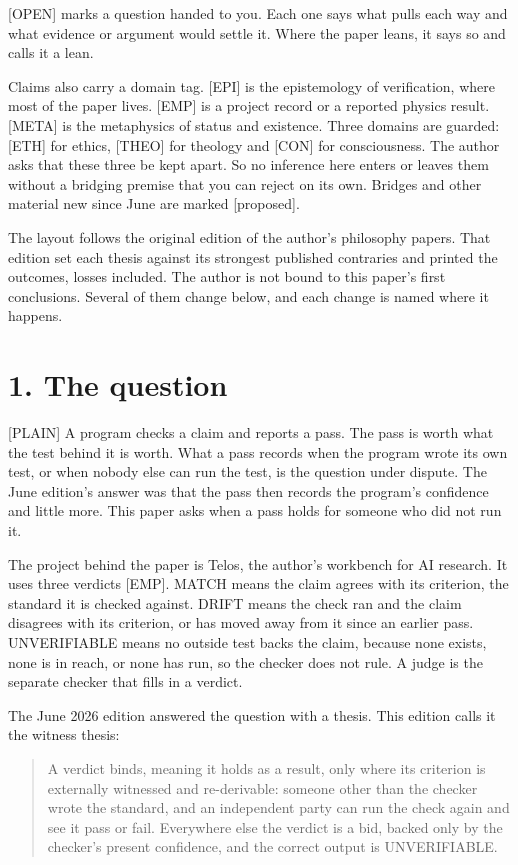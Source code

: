 \documentclass[11pt]{article}
\newcommand{\register}[1]{{\ttfamily\small #1}}
\begin{document}
\register{[OPEN]} marks a question handed to you. Each one says what pulls each way and what evidence or argument would settle it. Where the paper leans, it says so and calls it a lean.

Claims also carry a domain tag. [EPI] is the epistemology of verification, where most of the paper lives. [EMP] is a project record or a reported physics result. [META] is the metaphysics of status and existence. Three domains are guarded: [ETH] for ethics, [THEO] for theology and [CON] for consciousness. The author asks that these three be kept apart. So no inference here enters or leaves them without a bridging premise that you can reject on its own. Bridges and other material new since June are marked [proposed].

The layout follows the original edition of the author's philosophy papers. That edition set each thesis against its strongest published contraries and printed the outcomes, losses included. The author is not bound to this paper's first conclusions. Several of them change below, and each change is named where it happens.

\section*{1. The question}

\register{[PLAIN]} A program checks a claim and reports a pass. The pass is worth what the test behind it is worth. What a pass records when the program wrote its own test, or when nobody else can run the test, is the question under dispute. The June edition's answer was that the pass then records the program's confidence and little more. This paper asks when a pass holds for someone who did not run it.

The project behind the paper is Telos, the author's workbench for AI research. It uses three verdicts [EMP]. MATCH means the claim agrees with its criterion, the standard it is checked against. DRIFT means the check ran and the claim disagrees with its criterion, or has moved away from it since an earlier pass. UNVERIFIABLE means no outside test backs the claim, because none exists, none is in reach, or none has run, so the checker does not rule. A judge is the separate checker that fills in a verdict.

The June 2026 edition answered the question with a thesis. This edition calls it the witness thesis:

\begin{quote}
A verdict binds, meaning it holds as a result, only where its criterion is externally witnessed and re-derivable: someone other than the checker wrote the standard, and an independent party can run the check again and see it pass or fail. Everywhere else the verdict is a bid, backed only by the checker's present confidence, and the correct output is UNVERIFIABLE.
\end{quote}
\end{document}
